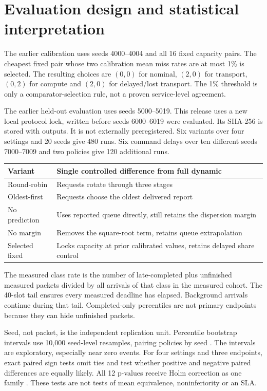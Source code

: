 \documentclass[10pt,a4paper]{article}
\newcommand{\page}[1]{\clearpage\section{#1}}
\begin{document}
\page{Evaluation design and statistical interpretation}
The earlier calibration uses seeds 4000--4004 and all 16 fixed capacity pairs.
The cheapest fixed pair whose two calibration mean miss rates are at most 1\%
is selected. The resulting choices are $(0,0)$ for nominal, $(2,0)$ for transport,
$(0,2)$ for compute and $(2,0)$ for delayed/lost transport. The 1\% threshold is
only a comparator-selection rule, not a proven service-level agreement.

The earlier held-out evaluation uses seeds 5000--5019. This release uses a new
local protocol lock, written before seeds 6000--6019 were evaluated. Its SHA-256
is stored with outputs. It is not externally preregistered. Six variants over
four settings and 20 seeds give 480 runs. Six command delays over ten different
seeds 7000--7009 and two policies give 120 additional runs.

\begin{center}\small
\begin{tabular}{p{36mm}p{114mm}}\toprule
Variant & Single controlled difference from full dynamic\\\midrule
Round-robin & Requests rotate through three stages\\
Oldest-first & Requests choose the oldest delivered report\\
No prediction & Uses reported queue directly, still retains the dispersion margin\\
No margin & Removes the square-root term, retains queue extrapolation\\
Selected fixed & Locks capacity at prior calibrated values, retains delayed share control\\\bottomrule
\end{tabular}\end{center}

The measured class rate is the number of late-completed plus unfinished measured
packets divided by all arrivals of that class in the measured cohort. The 40-slot
tail ensures every measured deadline has elapsed. Background arrivals continue
during that tail. Completed-only percentiles are not primary endpoints because
they can hide unfinished packets.

Seed, not packet, is the independent replication unit. Percentile bootstrap
intervals use 10,000 seed-level resamples, pairing policies by seed \cite{efron}.
The intervals are exploratory, especially near zero events. For four settings
and three endpoints, exact paired sign tests omit ties and test whether positive
and negative paired differences are equally likely. All 12 p-values receive
Holm correction as one family \cite{holm}. These tests are not tests of mean
equivalence, noninferiority or an SLA.
\end{document}
